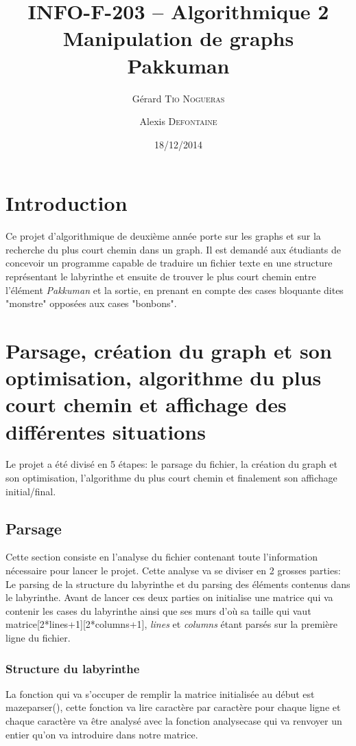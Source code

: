 \documentclass[12pt, oneside]{article}
\title{{\normalsize{INFO-F-203 -- Algorithmique 2}}\\Manipulation de graphs\\ Pakkuman}
\author{Gérard \textsc{Tio Nogueras} \and Alexis \textsc{Defontaine}}
\date{18/12/2014}
\begin{document}
\maketitle

\section{Introduction}
Ce projet d'algorithmique de deuxième année porte sur les graphs et sur la recherche du plus court chemin dans un graph.
Il est demandé aux étudiants de concevoir un programme capable de traduire un fichier texte en une structure représentant le labyrinthe et ensuite de trouver le plus court chemin entre l'élément \emph{Pakkuman} et la sortie, en prenant en compte des cases bloquante dites "monstre" opposées aux cases "bonbons".
\section{Parsage, création du graph et son optimisation, algorithme du plus court chemin et affichage des différentes situations}
Le projet a été divisé en 5 étapes: le parsage du fichier, la création du graph et son optimisation, l'algorithme du plus court chemin et finalement son affichage initial/final.

\subsection{Parsage}
Cette section consiste en l'analyse du fichier contenant toute l'information nécessaire pour lancer le projet. Cette analyse va se diviser en 2 grosses parties: Le parsing de la structure du labyrinthe et du parsing des éléments contenus dans le labyrinthe. Avant de lancer ces deux parties on initialise une matrice qui va contenir les cases du labyrinthe  ainsi que ses murs d'où sa taille qui vaut matrice[2*lines+1][2*columns+1], \emph{lines} et \emph{columns} étant parsés sur la première ligne du fichier. 
 
\subsubsection{Structure du labyrinthe}
La fonction qui va s'occuper de remplir la matrice initialisée au début est maze\textunderscore parser(), cette fonction va lire caractère par caractère pour chaque ligne et chaque caractère va être analysé avec la fonction analyse\textunderscore case qui va renvoyer un entier qu'on va introduire dans notre matrice.
\end{document}
